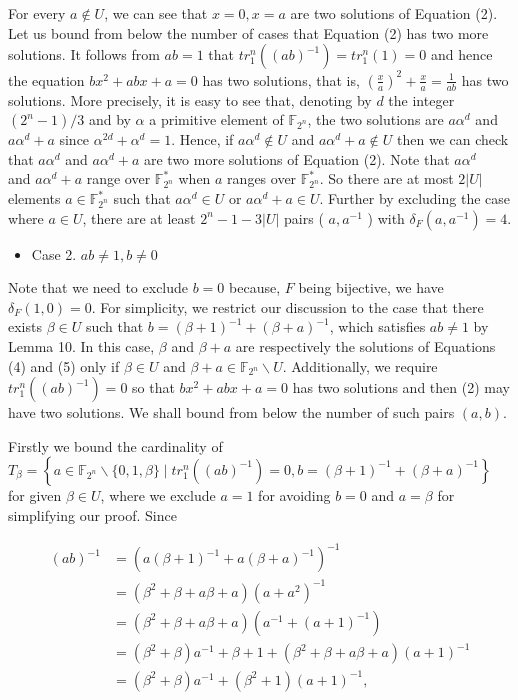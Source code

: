 \documentclass[10pt]{article}
\begin{document}
For every $a \notin U$, we can see that $x=0, x=a$ are two solutions of Equation (2). Let us bound from below the number of cases that Equation (2) has two more solutions. It follows from $a b=1$ that $t r_{1}^{n}\left((a b)^{-1}\right)=t r_{1}^{n}(1)=0$ and hence the equation $b x^{2}+a b x+a=0$ has two solutions, that is, $\left(\frac{x}{a}\right)^{2}+\frac{x}{a}=\frac{1}{a b}$ has two solutions. More precisely, it is easy to see that, denoting by $d$ the integer $\left(2^{n}-1\right) / 3$ and by $\alpha$ a primitive element of $\mathbb{F}_{2^{n}}$, the two solutions are $a \alpha^{d}$ and $a \alpha^{d}+a$ since $\alpha^{2 d}+\alpha^{d}=1$. Hence, if $a \alpha^{d} \notin U$ and $a \alpha^{d}+a \notin U$ then we can check that $a \alpha^{d}$ and $a \alpha^{d}+a$ are two more solutions of Equation (2). Note that $a \alpha^{d}$\\
and $a \alpha^{d}+a$ range over $\mathbb{F}_{2^{n}}^{*}$ when $a$ ranges over $\mathbb{F}_{2^{n}}^{*}$. So there are at most $2|U|$ elements $a \in \mathbb{F}_{2^{n}}^{*}$ such that $a \alpha^{d} \in U$ or $a \alpha^{d}+a \in U$. Further by excluding the case where $a \in U$, there are at least $2^{n}-1-3|U|$ pairs ( $a, a^{-1}$ ) with $\delta_{F}\left(a, a^{-1}\right)=4$.

\begin{itemize}
  \item Case 2. $a b \neq 1, b \neq 0$
\end{itemize}

Note that we need to exclude $b=0$ because, $F$ being bijective, we have $\delta_{F}(1,0)=0$. For simplicity, we restrict our discussion to the case that there exists $\beta \in U$ such that $b=(\beta+1)^{-1}+(\beta+a)^{-1}$, which satisfies $a b \neq 1$ by Lemma 10. In this case, $\beta$ and $\beta+a$ are respectively the solutions of Equations (4) and (5) only if $\beta \in U$ and $\beta+a \in \mathbb{F}_{2^{n}} \backslash U$. Additionally, we require $t r_{1}^{n}\left((a b)^{-1}\right)=0$ so that $b x^{2}+a b x+a=0$ has two solutions and then (2) may have two solutions. We shall bound from below the number of such pairs $(a, b)$.

Firstly we bound the cardinality of $T_{\beta}=\left\{a \in \mathbb{F}_{2^{n}} \backslash\{0,1, \beta\} \mid t r_{1}^{n}\left((a b)^{-1}\right)=0, b=\right. \left.(\beta+1)^{-1}+(\beta+a)^{-1}\right\}$ for given $\beta \in U$, where we exclude $a=1$ for avoiding $b=0$ and $a=\beta$ for simplifying our proof. Since

$$
\begin{aligned}
(a b)^{-1} & =\left(a(\beta+1)^{-1}+a(\beta+a)^{-1}\right)^{-1} \\
& =\left(\beta^{2}+\beta+a \beta+a\right)\left(a+a^{2}\right)^{-1} \\
& =\left(\beta^{2}+\beta+a \beta+a\right)\left(a^{-1}+(a+1)^{-1}\right) \\
& =\left(\beta^{2}+\beta\right) a^{-1}+\beta+1+\left(\beta^{2}+\beta+a \beta+a\right)(a+1)^{-1} \\
& =\left(\beta^{2}+\beta\right) a^{-1}+\left(\beta^{2}+1\right)(a+1)^{-1},
\end{aligned}
$$
\end{document}
